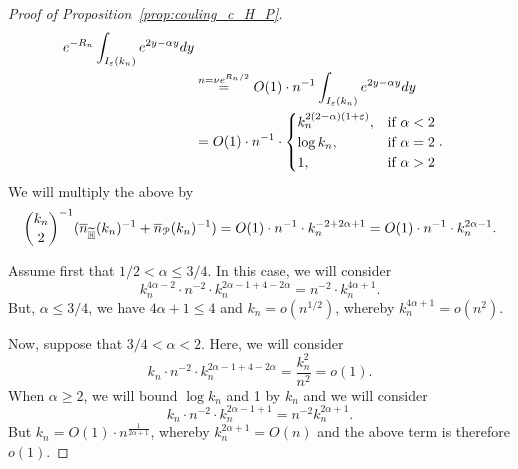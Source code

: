 \begin{proof}[Proof of Proposition~\ref{prop:couling_c_H_P}]
\begin{equation*}
\begin{split}
e^{-R_n} \int_{I_\varepsilon (k_n)} e^{2y -\alpha y} dy \\
&\stackrel{n =\nu e^{R_n/2}}{=} O(1) \cdot n^{-1} \int_{I_\varepsilon (k_n)} e^{2y -\alpha y} dy \\
&= O(1) \cdot n^{-1} \cdot 
\begin{cases}
k_n^{2(2-\alpha) (1+\varepsilon)}, & \mbox{if $\alpha < 2$} \\
\log k_n, & \mbox{if $\alpha =2$} \\
1, & \mbox{if $\alpha >2$}
\end{cases}.
\end{split}
\end{equation*}
We will multiply the above by $${k_n \choose 2}^{-1} (\overline{n}_{\widetilde{\mathbb{H}}}(k_n)^{-1} + \overline{n}_{{\mathcal P}}(k_n)^{-1}) = 
O(1) \cdot n^{-1} \cdot k_n^{-2 +2\alpha +1} = O(1) \cdot n^{-1} \cdot k_n^{2\alpha -1}.$$

Assume first that $1/2 <\alpha \leq 3/4$. In this case, we will consider
$$ k_n^{4\alpha -2} \cdot n^{-2} \cdot k_n^{2\alpha -1 + 4 - 2\alpha} = 
n^{-2} \cdot k_n^{4\alpha +1}.$$
But, $\alpha \leq 3/4$, we have $4\alpha +1 \leq 4$ and $k_n = o(n^{1/2})$, whereby $k_n^{4\alpha +1} = o(n^{2})$. 

Now, suppose that $3/4 < \alpha < 2$. Here, we will consider 
$$ k_n \cdot n^{-2} \cdot k_n^{2\alpha -1 + 4 - 2\alpha} =\frac{k_n^2}{n^2} = o(1).$$ 
When $\alpha \geq 2$, we will bound $\log k_n$ and 1 by $k_n$ and we will consider 
$$ k_n \cdot n^{-2} \cdot k_n^{2\alpha -1 +1}= n^{-2} k_n^{2\alpha +1}.$$ 
But $k_n = O(1)\cdot n^{\frac{1}{2\alpha +1}}$, whereby $k_n^{2\alpha +1} =O(n)$ and 
the above term is therefore $o(1)$.

\end{proof}


